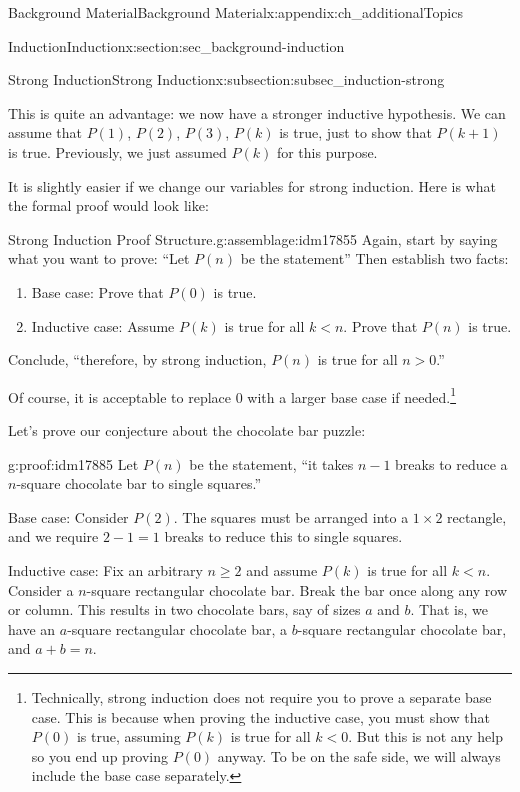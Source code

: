 \documentclass[oneside,10pt,]{book}
\numberwithin{equation}{chapter}
\newcommand{\lt}{<}
\newcommand{\gt}{>}
\begin{document}
\begin{appendixptx}{Background Material}{}{Background Material}{}{}{x:appendix:ch_additionalTopics}
\begin{sectionptx}{Induction}{}{Induction}{}{}{x:section:sec_background-induction}
\begin{subsectionptx}{Strong Induction}{}{Strong Induction}{}{}{x:subsection:subsec_induction-strong}
\par
This is quite an advantage: we now have a stronger inductive hypothesis. We can assume that \(P(1)\), \(P(2)\), \(P(3)\), \textellipsis{} \(P(k)\) is true, just to show that \(P(k+1)\) is true. Previously, we just assumed \(P(k)\) for this purpose.%
\par
It is slightly easier if we change our variables for strong induction. Here is what the formal proof would look like:%
\begin{assemblage}{Strong Induction Proof Structure.}{g:assemblage:idm17855}%
Again, start by saying what you want to prove: ``Let \(P(n)\) be the statement\textellipsis{}'' Then establish two facts:%
\begin{enumerate}
\item{}Base case: Prove that \(P(0)\) is true.%
\item{}Inductive case: Assume \(P(k)\) is true for all \(k \lt  n\). Prove that \(P(n)\) is true.%
\end{enumerate}
Conclude, ``therefore, by strong induction, \(P(n)\) is true for all \(n \gt 0\).''%
\end{assemblage}
Of course, it is acceptable to replace 0 with a larger base case if needed.\footnote{Technically, strong induction does not require you to prove a separate base case. This is because when proving the inductive case, you must show that \(P(0)\) is true, assuming \(P(k)\) is true for all \(k \lt  0\). But this is not any help so you end up proving \(P(0)\) anyway. To be on the safe side, we will always include the base case separately.\label{g:fn:idm17879}}%
\par
Let's prove our conjecture about the chocolate bar puzzle:%
\begin{proofptx}{}{g:proof:idm17885}
Let \(P(n)\) be the statement, ``it takes \(n-1\) breaks to reduce a \(n\)-square chocolate bar to single squares.''%
\par
Base case: Consider \(P(2)\). The squares must be arranged into a \(1\times 2\) rectangle, and we require \(2-1 = 1\) breaks to reduce this to single squares.%
\par
Inductive case: Fix an arbitrary \(n\ge 2\) and assume \(P(k)\) is true for all \(k \lt n\).  Consider a \(n\)-square rectangular chocolate bar.  Break the bar once along any row or column.  This results in two chocolate bars, say of sizes \(a\) and \(b\).  That is, we have an \(a\)-square rectangular chocolate bar, a \(b\)-square rectangular chocolate bar, and \(a+b = n\).%
\par

\end{proofptx}
\end{subsectionptx}
\end{sectionptx}
\end{appendixptx}
\end{document}
